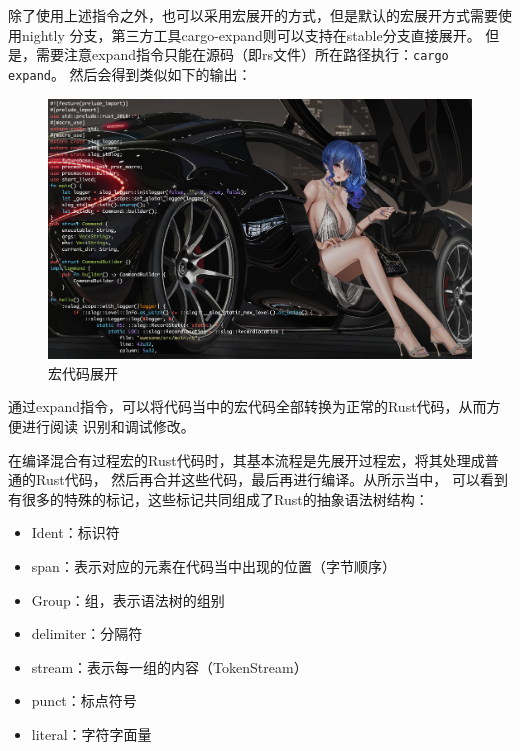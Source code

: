 除了使用上述指令之外，也可以采用宏展开的方式，但是默认的宏展开方式需要使用nightly
分支，第三方工具cargo-expand则可以支持在stable分支直接展开。
但是，需要注意expand指令只能在源码（即rs文件）所在路径执行：\texttt{cargo expand}。
然后会得到类似如下的输出：
\begin{figure}[H]
  \centering
  \includegraphics[width=\linewidth]{rust_cargo_expand.png}
  \caption{宏代码展开}
  \label{fig:rust_cargo_expand}
\end{figure}
通过expand指令，可以将代码当中的宏代码全部转换为正常的Rust代码，从而方便进行阅读
识别和调试修改。

在编译混合有过程宏的Rust代码时，其基本流程是先展开过程宏，将其处理成普通的Rust代码，
然后再合并这些代码，最后再进行编译。从所示当中，
可以看到有很多的特殊的标记，这些标记共同组成了Rust的抽象语法树结构：
\begin{itemize}
  \item Ident：标识符
  \item span：表示对应的元素在代码当中出现的位置（字节顺序）
  \item Group：组，表示语法树的组别
  \item delimiter：分隔符
  \item stream：表示每一组的内容（TokenStream）
  \item punct：标点符号
  \item literal：字符字面量
\end{itemize}

